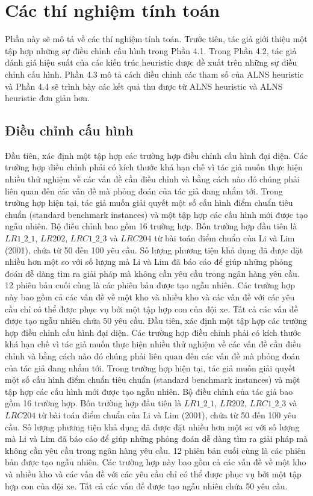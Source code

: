 \chapter{Các thí nghiệm tính toán}
Phần này sẽ mô tả về các thí nghiệm tính toán. Trước tiên, tác giả giới thiệu một tập hợp những sự điều chỉnh cấu hình trong Phần 4.1. Trong Phần 4.2, tác giả đánh giá hiệu suất của các kiến trúc heuristic được đề xuất trên những sự điều chỉnh cấu hình. Phần 4.3 mô tả cách điều chỉnh các tham số của ALNS heuristic và Phần 4.4 sẽ trình bày các kết quả thu được từ ALNS heuristic và ALNS heuristic đơn giản hơn.

\section{Điều chỉnh cấu hình}
Đầu tiên, xác định một tập hợp các trường hợp điều chỉnh cấu hình đại diện. Các trường hợp điều chỉnh phải có kích thước khá hạn chế vì tác giả muốn thực hiện nhiều thử nghiệm về các vấn đề cần điều chỉnh và bằng cách nào đó chúng phải liên quan đến các vấn đề mà phỏng đoán của tác giả đang nhắm tới. Trong trường hợp hiện tại, tác giả muốn giải quyết một số cấu hình điểm chuẩn tiêu chuẩn (standard benchmark instances) và một tập hợp các cấu hình mới được tạo ngẫu nhiên.
Bộ điều chỉnh bao gồm 16 trường hợp. Bốn trường hợp đầu tiên là $LR1\_2\_1$, $LR202$, $LRC1\_2\_3$ và $LRC204$ từ bài toán điểm chuẩn của Li và Lim (2001), chứa từ 50 đến 100 yêu cầu. Số lượng phương tiện khả dụng đã được đặt nhiều hơn một so với số lượng mà Li và Lim đã báo cáo để giúp những phỏng đoán dễ dàng tìm ra giải pháp mà không cần yêu cầu trong ngân hàng yêu cầu. 12 phiên bản cuối cùng là các phiên bản được tạo ngẫu nhiên. Các trường hợp này bao gồm cả các vấn đề về một kho và nhiều kho và các vấn đề với các yêu cầu chỉ có thể được phục vụ bởi một tập hợp con của đội xe. Tất cả các vấn đề được tạo ngẫu nhiên chứa 50 yêu cầu.
Đầu tiên, xác định một tập hợp các trường hợp điều chỉnh cấu hình đại diện. Các trường hợp điều chỉnh phải có kích thước khá hạn chế vì tác giả muốn thực hiện nhiều thử nghiệm về các vấn đề cần điều chỉnh và bằng cách nào đó chúng phải liên quan đến các vấn đề mà phỏng đoán của tác giả đang nhắm tới. Trong trường hợp hiện tại, tác giả muốn giải quyết một số cấu hình điểm chuẩn tiêu chuẩn (standard benchmark instances) và một tập hợp các cấu hình mới được tạo ngẫu nhiên.
Bộ điều chỉnh của tác giả bao gồm 16 trường hợp. Bốn trường hợp đầu tiên là $LR1\_2\_1$, $LR202$, $LRC1\_2\_3$ và $LRC204$ từ bài toán điểm chuẩn của Li và Lim (2001), chứa từ 50 đến 100 yêu cầu. Số lượng phương tiện khả dụng đã được đặt nhiều hơn một so với số lượng mà Li và Lim đã báo cáo để giúp những phỏng đoán dễ dàng tìm ra giải pháp mà không cần yêu cầu trong ngân hàng yêu cầu. 12 phiên bản cuối cùng là các phiên bản được tạo ngẫu nhiên. Các trường hợp này bao gồm cả các vấn đề về một kho và nhiều kho và các vấn đề với các yêu cầu chỉ có thể được phục vụ bởi một tập hợp con của đội xe. Tất cả các vấn đề được tạo ngẫu nhiên chứa 50 yêu cầu.

